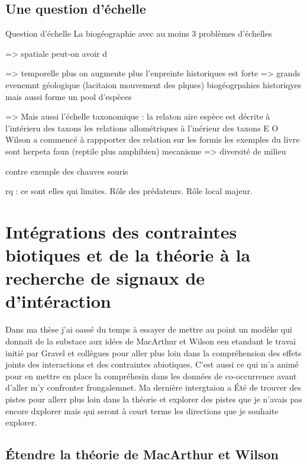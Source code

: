 \subsection{Une question d'échelle}\label{une-question-duxe9chelle-1}

Question d'échelle La biogéographie avec au moins 3 problèmes d'échelles

=\textgreater{} spatiale peut-on avoir d

=\textgreater{} temporelle plus on augmente plus l'enpreinte historiques
est forte =\textgreater{} grands evenemnt géologique (lacitaion
mouvement des plques) biogéogrpahies historiqyes mais aussi forme un
pool d'espèces

=\textgreater{} Mais aussi l'échelle taxonomique : la relaton aire
espèce est décrite à l'intérieru des taxons les relations allométriques
à l'inérieur des taxons E O Wilson a commencé à rappporter des relation
sur les formis les exemples du livre sont herpeta faun (reptile plus
amphibien) mecanisme =\textgreater{} diversité de milieu

contre exemple des chauves souris

rq : ce sont elles qui limites. Rôle des prédateurs. Rôle local majeur.

\section*{Intégrations des contraintes biotiques et de la théorie à la
recherche de signaux de
d'intéraction}\label{intuxe9grations-des-contraintes-biotiques-et-de-la-thuxe9orie-uxe0-la-recherche-de-signaux-de-dintuxe9raction}

Dans ma thèse j'ai oassé du temps à essayer de mettre au point un modèke
qui donnait de la substace aux idées de MacArthur et Wilson een etandant
le travai initié par Gravel et collègues pour aller plus loin dans la
compréhension des effets joints des interactions et des contraintes
abiotiques. C'est aussi ce qui m'a animé pour en mettre en place la
compréhesin dans les données de co-occurrence avant d'aller m'y
confronter frongalemnet. Ma dernière intergtaion a Été de trouver des
pistes pour allerr plus loin dans la théorie et explorer des pistes que
je n'avais pas encore dxplorer mais qui seront à court terme les
directions que je souhaite explorer.

\subsection*{Étendre la théorie de MacArthur et
Wilson}\label{uxe9tendre-la-thuxe9orie-de-macarthur-et-wilson}

